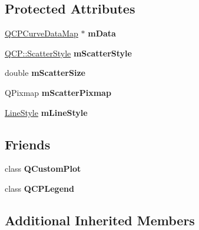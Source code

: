 \subsection*{Protected Attributes}
\begin{DoxyCompactItemize}
\item 
\hypertarget{classQCPCurve_a88d533e455bca96004b049e99168731b}{\hyperlink{qcustomplot_8h_a444d37ec9cb2951b3a7fe443c34d1658}{Q\-C\-P\-Curve\-Data\-Map} $\ast$ {\bfseries m\-Data}}\label{classQCPCurve_a88d533e455bca96004b049e99168731b}

\item 
\hypertarget{classQCPCurve_a5700a112cb679dc983648f67151d5cae}{\hyperlink{namespaceQCP_af66d0711d42fe78d96c28abadc67f26f}{Q\-C\-P\-::\-Scatter\-Style} {\bfseries m\-Scatter\-Style}}\label{classQCPCurve_a5700a112cb679dc983648f67151d5cae}

\item 
\hypertarget{classQCPCurve_a504f8e596491386d133de153c73a0777}{double {\bfseries m\-Scatter\-Size}}\label{classQCPCurve_a504f8e596491386d133de153c73a0777}

\item 
\hypertarget{classQCPCurve_a04103a65b13b2218265e74c567a7061e}{Q\-Pixmap {\bfseries m\-Scatter\-Pixmap}}\label{classQCPCurve_a04103a65b13b2218265e74c567a7061e}

\item 
\hypertarget{classQCPCurve_ae1f35ae2b15aee8e15bcdfec5be95156}{\hyperlink{classQCPCurve_a2710e9f79302152cff794c6e16cc01f1}{Line\-Style} {\bfseries m\-Line\-Style}}\label{classQCPCurve_ae1f35ae2b15aee8e15bcdfec5be95156}

\end{DoxyCompactItemize}
\subsection*{Friends}
\begin{DoxyCompactItemize}
\item 
\hypertarget{classQCPCurve_a1cdf9df76adcfae45261690aa0ca2198}{class {\bfseries Q\-Custom\-Plot}}\label{classQCPCurve_a1cdf9df76adcfae45261690aa0ca2198}

\item 
\hypertarget{classQCPCurve_a8429035e7adfbd7f05805a6530ad5e3b}{class {\bfseries Q\-C\-P\-Legend}}\label{classQCPCurve_a8429035e7adfbd7f05805a6530ad5e3b}

\end{DoxyCompactItemize}
\subsection*{Additional Inherited Members}


